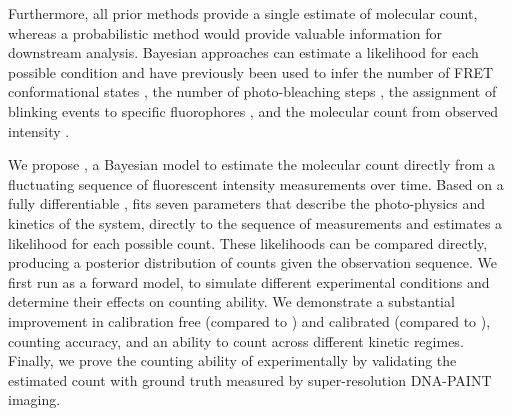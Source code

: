 Furthermore, all prior methods provide a single estimate of molecular count, whereas 
a probabilistic method would provide valuable information for downstream analysis.
  Bayesian approaches can estimate a likelihood for each possible condition 
  and have previously been used to infer the number of FRET conformational 
  states \citep{hon_bayesian-estimated_2019, bronson_learning_2009}, 
  the number of photo-bleaching steps \citep{garry_bayesian_2020},
  the assignment of blinking events to specific fluorophores \citep{gabitto_bayesian_2021, fazel_bayesian_2019},
  and the molecular count from observed intensity \citep{nino_2017}.

We propose \ours, a Bayesian model to estimate the molecular count
directly from a fluctuating sequence of fluorescent intensity measurements over
time.
  Based on a fully differentiable \hmm, \ours fits
  seven parameters that describe the photo-physics and kinetics of the system, 
  directly to the sequence of measurements and
  estimates a likelihood for each possible count.
  These likelihoods can be compared directly, producing a posterior
  distribution of counts given the observation sequence.
  We first run \ours as a forward model, to simulate
  different experimental conditions and determine their effects on counting ability.
  We demonstrate a substantial improvement in calibration free (compared to \lbfcs) 
  and calibrated (compared to \qpaint), counting accuracy, and 
  an ability to count across different kinetic regimes.
  Finally, we prove the counting ability of \ours experimentally by validating 
  the estimated count with ground truth measured by super-resolution DNA-PAINT imaging.
